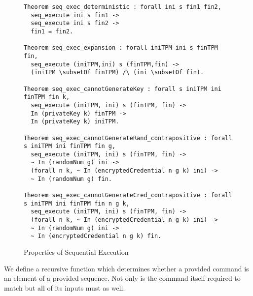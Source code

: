 \begin{figure}[h]
\begin{lstlisting}[language=Coq]
Theorem seq_exec_deterministic : forall ini s fin1 fin2,
  seq_execute ini s fin1 ->
  seq_execute ini s fin2 ->
  fin1 = fin2.

Theorem seq_exec_expansion : forall iniTPM ini s finTPM fin,
  seq_execute (iniTPM,ini) s (finTPM,fin) ->
  (iniTPM \subsetOf finTPM) /\ (ini \subsetOf fin).

Theorem seq_exec_cannotGenerateKey : forall s iniTPM ini finTPM fin k,
  seq_execute (iniTPM, ini) s (finTPM, fin) ->
  In (privateKey k) finTPM ->
  In (privateKey k) iniTPM.

Theorem seq_exec_cannotGenerateRand_contrapositive : forall s iniTPM ini finTPM fin g,
  seq_execute (iniTPM, ini) s (finTPM, fin) ->
  ~ In (randomNum g) ini ->
  (forall n k, ~ In (encryptedCredential n g k) ini) ->
  ~ In (randomNum g) fin.

Theorem seq_exec_cannotGenerateCred_contrapositive : forall s iniTPM ini finTPM fin n g k,
  seq_execute (iniTPM, ini) s (finTPM, fin) ->
  (forall n k, ~ In (encryptedCredential n g k) ini) ->
  ~ In (randomNum g) ini ->
  ~ In (encryptedCredential n g k) fin.
\end{lstlisting}
\caption{Properties of Sequential Execution}
\end{figure}

We define a recursive function which determines whether a provided command is an element of a provided sequence. Not only is the command itself required to match but all of its inputs must as well.